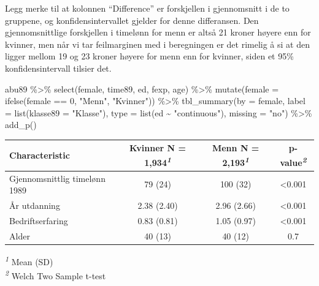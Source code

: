 \documentclass[
  norsk,
  letterpaper,
  DIV=11,
  numbers=noendperiod]{scrreprt}
\newenvironment{Shaded}{\begin{snugshade}}{\end{snugshade}}
\newcommand{\AttributeTok}[1]{\textcolor[rgb]{0.40,0.45,0.13}{#1}}
\newcommand{\DecValTok}[1]{\textcolor[rgb]{0.68,0.00,0.00}{#1}}
\newcommand{\FunctionTok}[1]{\textcolor[rgb]{0.28,0.35,0.67}{#1}}
\newcommand{\NormalTok}[1]{\textcolor[rgb]{0.00,0.23,0.31}{#1}}
\newcommand{\SpecialCharTok}[1]{\textcolor[rgb]{0.37,0.37,0.37}{#1}}
\newcommand{\StringTok}[1]{\textcolor[rgb]{0.13,0.47,0.30}{#1}}
\theoremstyle{definition}
\theoremstyle{remark}
\begin{document}
Legg merke til at kolonnen ``Difference'' er forskjellen i gjennomsnitt
i de to gruppene, og konfidensintervallet gjelder for denne differansen.
Den gjennomsnittlige forskjellen i timelønn for menn er altså 21 kroner
høyere enn for kvinner, men når vi tar feilmarginen med i beregningen er
det rimelig å si at den ligger mellom 19 og 23 kroner høyere for menn
enn for kvinner, siden et 95\% konfidensintervall tilsier det.

\begin{Shaded}
\begin{Highlighting}[]
\NormalTok{abu89 }\SpecialCharTok{\%\textgreater{}\%} 
  \FunctionTok{select}\NormalTok{(female, time89, ed,  fexp, age) }\SpecialCharTok{\%\textgreater{}\%} 
  \FunctionTok{mutate}\NormalTok{(}\AttributeTok{female =} \FunctionTok{ifelse}\NormalTok{(female }\SpecialCharTok{==} \DecValTok{0}\NormalTok{, }\StringTok{"Menn"}\NormalTok{, }\StringTok{"Kvinner"}\NormalTok{)) }\SpecialCharTok{\%\textgreater{}\%} 
    \FunctionTok{tbl\_summary}\NormalTok{(}\AttributeTok{by =}\NormalTok{ female, }
                \AttributeTok{label =} \FunctionTok{list}\NormalTok{(}\AttributeTok{klasse89 =} \StringTok{"Klasse"}\NormalTok{), }
              \AttributeTok{type =} \FunctionTok{list}\NormalTok{(ed }\SpecialCharTok{\textasciitilde{}} \StringTok{"continuous"}\NormalTok{), }
              \AttributeTok{missing =} \StringTok{"no"}\NormalTok{) }\SpecialCharTok{\%\textgreater{}\%} 
  \FunctionTok{add\_p}\NormalTok{() }
\end{Highlighting}
\end{Shaded}

\begin{table}
\fontsize{12.0pt}{14.0pt}\selectfont
\begin{tabular*}{\linewidth}{@{\extracolsep{\fill}}lccc}
\toprule
\textbf{Characteristic} & \textbf{Kvinner}  N = 1,934\textsuperscript{\textit{1}} & \textbf{Menn}  N = 2,193\textsuperscript{\textit{1}} & \textbf{p-value}\textsuperscript{\textit{2}} \\ 
\midrule\addlinespace[2.5pt]
Gjennomsnittlig timelønn 1989 & 79 (24) & 100 (32) & <0.001 \\ 
År utdanning & 2.38 (2.40) & 2.96 (2.66) & <0.001 \\ 
Bedriftserfaring & 0.83 (0.81) & 1.05 (0.97) & <0.001 \\ 
Alder & 40 (13) & 40 (12) & 0.7 \\ 
\bottomrule
\end{tabular*}
\begin{minipage}{\linewidth}
\vspace{.05em}
\textsuperscript{\textit{1}} Mean (SD)\\
\textsuperscript{\textit{2}} Welch Two Sample t-test\\
\end{minipage}
\end{table}
\end{document}
